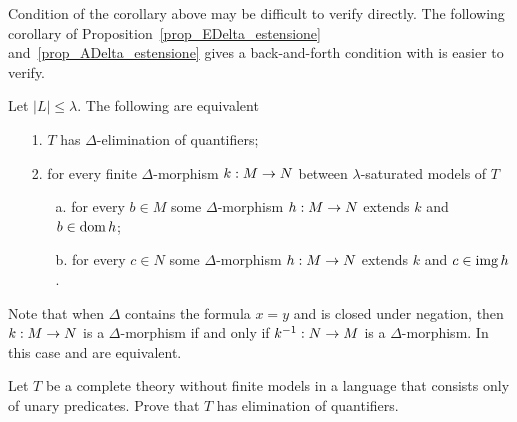 Condition  of the corollary above may be difficult to verify directly. The following corollary of Proposition~\ref{prop_EDelta_estensione} and~\ref{prop_ADelta_estensione} gives a back-and-forth condition with is easier to verify.

\begin{corollary}\label{corol_QE_back_and_forth}
Let $|L|\le\lambda$. The following are equivalent
\begin{itemize}
\item[1.] $T$ has $\Delta$-elimination of quantifiers;
\item[2.] for every finite $\Delta$-morphism $k:M\rightarrow N$ between $\lambda$-saturated models of $T$
\begin{itemize}                                                                                               \item[a.] for every $b\in M$ some $\Delta$-morphism $h:M\rightarrow N$ extends $k$ and $b\in\mathop{\rm dom} h$;                                                                                \item[b.] for every $c\in N$ some $\Delta$-morphism $h:M\rightarrow N$ extends $k$ and $c\in\mathop{\rm img} h$.\noindent\nolinebreak[4]\hfill\rlap{\ \ $\Box$}                                                                   \end{itemize}
\end{itemize}
\end{corollary}

Note that when $\Delta$ contains the formula $x=y$ and is closed under negation, then  $k:M\rightarrow N$ is a $\Delta$-morphism if and only if $k^{-1}:N\rightarrow M$ is a $\Delta$-morphism. In this case  and  are equivalent.

\begin{exercise}
Let $T$ be a complete theory without finite models in a language that consists only of unary predicates. Prove that $T$ has elimination of quantifiers.\QED
\end{exercise}

